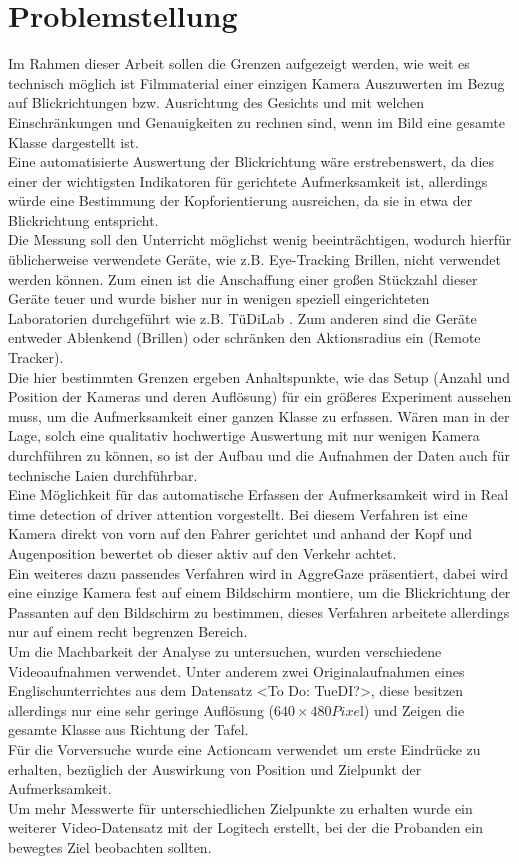 \section{Problemstellung}
\label{Problemstellung}
Im Rahmen dieser Arbeit sollen die Grenzen aufgezeigt werden, wie weit es technisch möglich ist Filmmaterial einer einzigen Kamera Auszuwerten im Bezug auf Blickrichtungen bzw. Ausrichtung des Gesichts und mit welchen Einschränkungen und Genauigkeiten zu rechnen sind, wenn im Bild eine gesamte Klasse dargestellt ist.\\
Eine automatisierte Auswertung der Blickrichtung wäre erstrebenswert, da dies einer der wichtigsten Indikatoren für gerichtete Aufmerksamkeit ist, allerdings würde eine Bestimmung der Kopforientierung ausreichen, da sie in etwa der Blickrichtung entspricht.\\
Die Messung soll den Unterricht möglichst wenig beeinträchtigen, wodurch hierfür üblicherweise verwendete Geräte, wie z.B. Eye-Tracking Brillen, nicht verwendet werden können. Zum einen ist die Anschaffung einer großen Stückzahl dieser Geräte teuer und wurde bisher nur in wenigen speziell eingerichteten Laboratorien durchgeführt wie z.B. TüDiLab \cite{TueDiLab}. Zum anderen sind die Geräte entweder Ablenkend (Brillen) oder schränken den Aktionsradius ein (Remote Tracker).\\
Die hier bestimmten Grenzen ergeben Anhaltspunkte, wie das Setup (Anzahl und Position der Kameras und deren Auflösung) für ein größeres Experiment aussehen muss, um die Aufmerksamkeit einer ganzen Klasse zu erfassen. Wären man in der Lage, solch eine qualitativ hochwertige Auswertung mit nur wenigen Kamera durchführen zu können, so ist der Aufbau und die Aufnahmen der Daten auch für technische Laien durchführbar.\\
Eine Möglichkeit für das automatische Erfassen der Aufmerksamkeit wird in \glqq Real time detection of driver attention\grqq\cite{driverAttention} vorgestellt. Bei diesem Verfahren ist eine Kamera direkt von vorn auf den Fahrer gerichtet und anhand der Kopf und Augenposition bewertet ob dieser aktiv auf den Verkehr achtet.\\
Ein weiteres dazu passendes Verfahren wird in \glqq AggreGaze\grqq \cite{AggreGaze} präsentiert, dabei wird eine einzige Kamera fest auf einem Bildschirm montiere, um die Blickrichtung der Passanten auf den Bildschirm zu bestimmen, dieses Verfahren arbeitete allerdings nur auf einem recht begrenzen Bereich.\\
Um die Machbarkeit der Analyse zu untersuchen, wurden verschiedene Videoaufnahmen verwendet. Unter anderem zwei Originalaufnahmen eines Englischunterrichtes aus dem Datensatz <To Do: TueDI?>, diese besitzen allerdings nur eine sehr geringe Auflösung ($640\times 480 Pixe$l) und Zeigen die gesamte Klasse aus Richtung der Tafel.\\
Für die Vorversuche wurde eine Actioncam verwendet um erste Eindrücke zu erhalten, bezüglich der Auswirkung von Position und Zielpunkt der Aufmerksamkeit.\\
Um mehr Messwerte für unterschiedlichen Zielpunkte zu erhalten wurde ein weiterer Video-Datensatz mit der Logitech erstellt, bei der die Probanden ein bewegtes Ziel beobachten sollten.